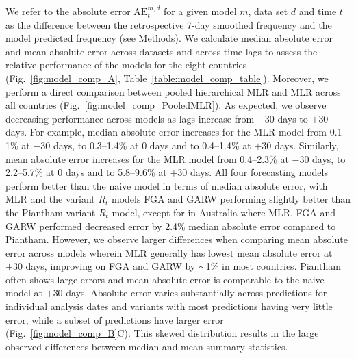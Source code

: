 \documentclass[11pt,oneside,letterpaper]{article}
\begin{document}
We refer to the absolute error $\mathrm{AE}_{t}^{m,d}$ for a given model $m$, data set $d$ and time $t$ as the difference between the retrospective 7-day smoothed frequency and the model predicted frequency (see Methods).
We calculate median absolute error and mean absolute error across datasets and across time lags to assess the relative performance of the models for the eight countries (Fig.~\ref{fig:model_comp_A}, Table~\ref{table:model_comp_table}).
Moreover, we perform a direct comparison between pooled hierarchical MLR and MLR across all countries (Fig.~\ref{fig:model_comp_PooledMLR}). 
As expected, we observe decreasing performance across models as lags increase from $-30$ days to $+30$ days.
For example, median absolute error increases for the MLR model from 0.1--1\% at $-30$ days, to 0.3--1.4\% at 0 days and to 0.4--1.4\% at $+30$ days.
Similarly, mean absolute error increases for the MLR model from 0.4--2.3\% at $-30$ days, to 2.2--5.7\% at 0 days and to 5.8--9.6\% at $+30$ days.
All four forecasting models perform better than the naive model in terms of median absolute error, with MLR and the variant $R_t$ models FGA and GARW performing slightly better than the Piantham variant $R_t$ model, except for in Australia where MLR, FGA and GARW performed decreased error by 2.4\% median absolute error compared to Piantham.
However, we observe larger differences when comparing mean absolute error across models wherein MLR generally has lowest mean absolute error at $+30$ days, improving on FGA and GARW by $\sim$1\% in most countries.
Piantham often shows large errors and mean absolute error is comparable to the naive model at $+30$ days.
Absolute error varies substantially across predictions for individual analysis dates and variants with most predictions having very little error, while a subset of predictions have larger error (Fig.~\ref{fig:model_comp_B}C).
This skewed distribution results in the large observed differences between median and mean summary statistics.
\end{document}
